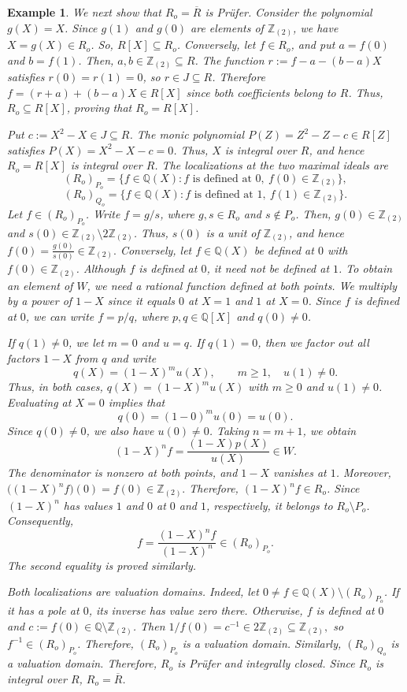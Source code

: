 \documentclass[12pt]{article}
\newtheorem{example}{Example}
\begin{document}
\begin{example}
		We next show that $R_o=\overline R$ is Prüfer. Consider the polynomial $g(X)=X$. Since $g(1)$ and $g(0)$ are elements of $\mathbb{Z}_{(2)}$, we have $X=g(X)\in R_o$. So, $R[X]\subseteq R_o$. Conversely, let $f\in R_o$, and put $a=f(0)$ and $b=f(1)$. Then, $a,b\in\mathbb Z_{(2)}\subseteq R$. The function $r:=f-a-(b-a)X$ satisfies $r(0)=r(1)=0$, so $r\in J\subseteq R$. Therefore $f=(r+a)+(b-a)X\in R[X]$ since both coefficients belong to $R$. Thus, $R_o\subseteq R[X]$, proving that $R_o=R[X]$. 
	
		Put $c:=X^2-X\in J\subseteq R$. The monic polynomial $P(Z)=Z^2-Z-c\in R[Z]$ satisfies $P(X)=X^2-X-c=0$. Thus, $X$ is integral over $R$, and hence $R_o=R[X]$ is integral over $R$. The localizations at the two maximal ideals are
		\[(R_o)_{P_o} = \{f\in\mathbb Q(X): f\text{ is defined at }0,\ 	f(0)\in\mathbb Z_{(2)}\},\]
		\[(R_o)_{Q_o} = \{f\in\mathbb Q(X): f\text{ is defined at }1,\  f(1)\in\mathbb Z_{(2)}\}. \]
		Let $f\in(R_o)_{P_o}$. Write $f=g/s$, where	$g,s\in R_o$ and $s\notin P_o$. Then, $g(0)\in\mathbb Z_{(2)}$ and $s(0)\in\mathbb Z_{(2)}\setminus2\mathbb Z_{(2)}$.	Thus, $s(0)$ is a unit of $\mathbb Z_{(2)}$, and hence $f(0)=\frac{g(0)}{s(0)}\in\mathbb Z_{(2)}.$ Conversely, let $f\in\mathbb Q(X)$ be defined at $0$ with $f(0)\in\mathbb Z_{(2)}$. Although $f$ is defined at $0$, it need not be defined at $1$. To obtain an element of $W$, we need a rational function defined at both points. We multiply by a power of $1-X$ since it equals $0$ at $X=1$ and $1$ at $X=0$. Since $f$ is defined at $0$, we can write $f=p/q$, where $p,q\in\mathbb Q[X]$ and $q(0)\neq0$.
	
		If $q(1)\neq0$, we let $m=0$ and $u=q$. If $q(1)=0$, then we factor out all factors $1-X$ from $q$ and write
		\[ q(X)=(1-X)^m u(X), \qquad m\geq1,\quad u(1)\neq0. \]
		Thus, in both cases, $q(X)=(1-X)^m u(X)$ with $m\geq0$ and $u(1)\neq0$.	Evaluating at $X=0$ implies that
		\[ q(0)=(1-0)^m u(0)=u(0). \]
		Since $q(0)\neq0$, we also have $u(0)\neq0$. Taking $n=m+1$, we obtain
		\[ (1-X)^nf=\frac{(1-X)p(X)}{u(X)}\in W. \]
		The denominator is nonzero at both points, and $1-X$ vanishes at $1$. Moreover, $\bigl((1-X)^nf\bigr)(0) =f(0)\in\mathbb Z_{(2)}.$  Therefore, $(1-X)^nf\in R_o$. Since $(1-X)^n$ has values $1$ and $0$ at $0$ and $1$, respectively, it belongs to $R_o\setminus P_o$.	Consequently,
		\[ f=\frac{(1-X)^nf}{(1-X)^n}\in(R_o)_{P_o}. \]
		The second equality is proved similarly.
	
		Both localizations are valuation domains. Indeed, let	$0\neq f\in\mathbb Q(X)\setminus(R_o)_{P_o}$. If it has a pole at $0$, its inverse has value zero there. Otherwise, $f$ is defined at $0$ and $c:=f(0)\in\mathbb Q\setminus\mathbb Z_{(2)}$. Then $1/f(0)=c^{-1}\in2\mathbb Z_{(2)}\subseteq\mathbb Z_{(2)},$ so $f^{-1}\in(R_o)_{P_o}$. Therefore, $(R_o)_{P_o}$ is a valuation domain. Similarly, $(R_o)_{Q_o}$ is a valuation domain. Therefore, $R_o$ is Prüfer and integrally closed. Since $R_o$ is integral over $R$, $R_o=\overline R$.
	

\end{example}
\end{document}
